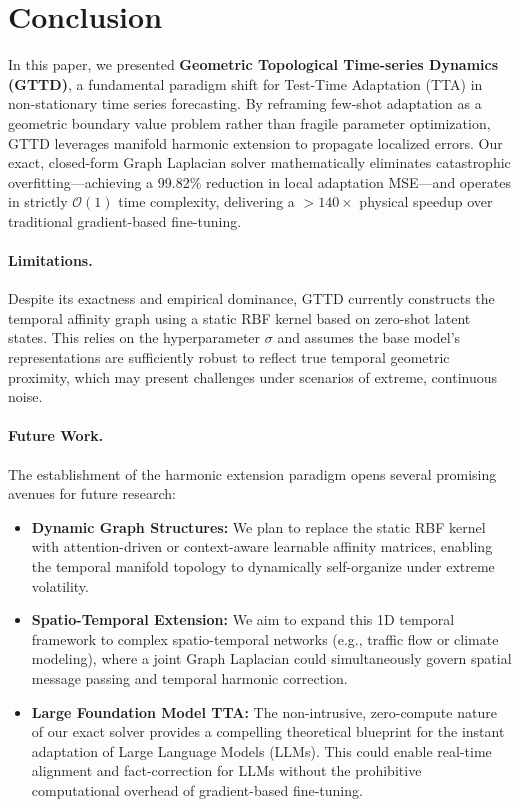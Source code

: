 \documentclass{article}
\begin{document}
\section{Conclusion}

In this paper, we presented \textbf{Geometric Topological Time-series Dynamics (GTTD)}, a fundamental paradigm shift for Test-Time Adaptation (TTA) in non-stationary time series forecasting. By reframing few-shot adaptation as a geometric boundary value problem rather than fragile parameter optimization, GTTD leverages manifold harmonic extension to propagate localized errors. Our exact, closed-form Graph Laplacian solver mathematically eliminates catastrophic overfitting---achieving a 99.82\% reduction in local adaptation MSE---and operates in strictly $\mathcal{O}(1)$ time complexity, delivering a $>140\times$ physical speedup over traditional gradient-based fine-tuning.

\paragraph{Limitations.} Despite its exactness and empirical dominance, GTTD currently constructs the temporal affinity graph using a static RBF kernel based on zero-shot latent states. This relies on the hyperparameter $\sigma$ and assumes the base model's representations are sufficiently robust to reflect true temporal geometric proximity, which may present challenges under scenarios of extreme, continuous noise.

\paragraph{Future Work.} The establishment of the harmonic extension paradigm opens several promising avenues for future research:
\begin{itemize}
    \item \textbf{Dynamic Graph Structures:} We plan to replace the static RBF kernel with attention-driven or context-aware learnable affinity matrices, enabling the temporal manifold topology to dynamically self-organize under extreme volatility.
    \item \textbf{Spatio-Temporal Extension:} We aim to expand this 1D temporal framework to complex spatio-temporal networks (e.g., traffic flow or climate modeling), where a joint Graph Laplacian could simultaneously govern spatial message passing and temporal harmonic correction.
    \item \textbf{Large Foundation Model TTA:} The non-intrusive, zero-compute nature of our exact solver provides a compelling theoretical blueprint for the instant adaptation of Large Language Models (LLMs). This could enable real-time alignment and fact-correction for LLMs without the prohibitive computational overhead of gradient-based fine-tuning.
\end{itemize}
\end{document}
